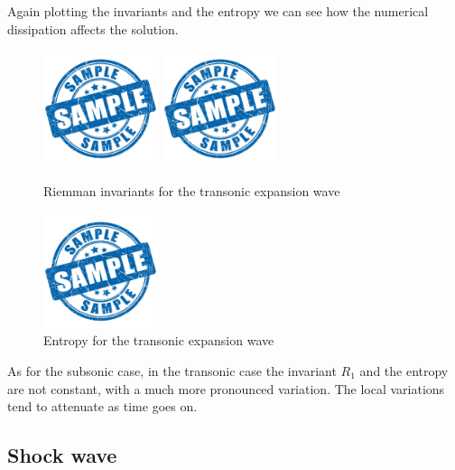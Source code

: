 \documentclass{report}
\begin{document}
Again plotting the invariants and the entropy we can see how the numerical dissipation affects the solution.
\begin{figure}[H]
    \centering
    \includegraphics[width=0.3\textwidth]{Images/sample.jpg}
    \includegraphics[width=0.3\textwidth]{Images/sample.jpg}
    \caption{Riemman invariants for the transonic expansion wave}
    \label{fig:transonic_expansion_wave_invariants}
\end{figure}
\begin{figure}[H]
    \centering
    \includegraphics[width=0.3\textwidth]{Images/sample.jpg}
    \caption{Entropy for the transonic expansion wave}
    \label{fig:transonic_expansion_wave_entropy}
\end{figure}
As for the subsonic case, in the transonic case the invariant $R_1$ and the entropy are not constant, with a much more pronounced variation. The local variations
tend to attenuate as time goes on.


\subsection*{Shock wave}
\end{document}

